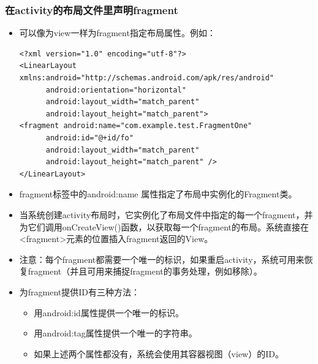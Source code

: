 \documentclass[9pt, b5paper]{article}
\begin{document}
\subsubsection{在activity的布局文件里声明fragment}
\label{sec-2-3-1}
\begin{itemize}
\item 可以像为view一样为fragment指定布局属性。例如：
\begin{verbatim}
<?xml version="1.0" encoding="utf-8"?>
<LinearLayout xmlns:android="http://schemas.android.com/apk/res/android"
      android:orientation="horizontal"
      android:layout_width="match_parent"
      android:layout_height="match_parent">　
<fragment android:name="com.example.test.FragmentOne"
      android:id="@+id/fo"
      android:layout_width="match_parent"
      android:layout_height="match_parent" />
</LinearLayout>
\end{verbatim}
\item fragment标签中的android:name 属性指定了布局中实例化的Fragment类。
\item 当系统创建activity布局时，它实例化了布局文件中指定的每一个fragment，并为它们调用onCreateView()函数，以获取每一个fragment的布局。系统直接在<fragment>元素的位置插入fragment返回的View。
\item 注意：每个fragment都需要一个唯一的标识，如果重启activity，系统可用来恢复fragment（并且可用来捕捉fragment的事务处理，例如移除）。
\item 为fragment提供ID有三种方法：
\begin{itemize}
\item 用android:id属性提供一个唯一的标识。　
\item 用android:tag属性提供一个唯一的字符串。　
\item 如果上述两个属性都没有，系统会使用其容器视图（view）的ID。　
\end{itemize}
\end{itemize}
\end{document}
